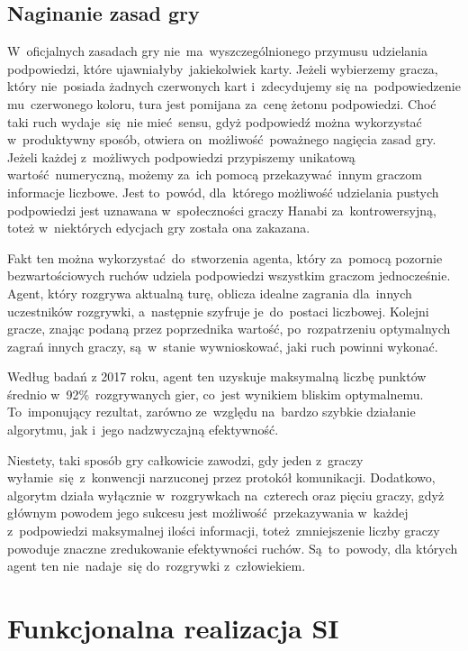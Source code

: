 \documentclass[declaration,shortabstract,inz]{iithesis}
\begin{document}
\section{Naginanie zasad gry}

W~oficjalnych zasadach gry nie~ma~wyszczególnionego przymusu udzielania podpowiedzi, które ujawniałyby jakiekolwiek karty. Jeżeli wybierzemy gracza, który nie~posiada żadnych czerwonych kart i~zdecydujemy się na~podpowiedzenie mu~czerwonego koloru, tura jest pomijana za~cenę żetonu podpowiedzi. Choć taki ruch wydaje~się~nie mieć sensu, gdyż podpowiedź można wykorzystać w~produktywny sposób, otwiera on~możliwość poważnego nagięcia zasad gry. Jeżeli każdej z~możliwych podpowiedzi przypiszemy unikatową wartość numeryczną, możemy za~ich pomocą przekazywać innym graczom informacje liczbowe. Jest to~powód, dla~którego możliwość udzielania pustych podpowiedzi jest uznawana w~społeczności graczy Hanabi za~kontrowersyjną, toteż w~niektórych edycjach gry została ona zakazana.

Fakt ten można wykorzystać do~stworzenia agenta, który za~pomocą pozornie bezwartościowych ruchów udziela podpowiedzi wszystkim graczom jednocześnie. Agent, który rozgrywa aktualną turę, oblicza idealne zagrania dla~innych uczestników rozgrywki, a~następnie szyfruje je~do~postaci liczbowej. Kolejni gracze, znając podaną przez poprzednika wartość, po~rozpatrzeniu optymalnych zagrań innych graczy, są~w~stanie wywnioskować, jaki ruch powinni wykonać.

Według badań z 2017 roku\cite{HatPlayer}, agent ten uzyskuje maksymalną liczbę punktów średnio w~92\%~rozgrywanych gier, co~jest wynikiem bliskim optymalnemu. To~imponujący rezultat, zarówno ze~względu na~bardzo szybkie działanie algorytmu, jak i~jego nadzwyczajną efektywność.

Niestety, taki sposób gry całkowicie zawodzi, gdy jeden z~graczy wyłamie~się z~konwencji narzuconej przez protokół komunikacji. Dodatkowo, algorytm działa wyłącznie w~rozgrywkach na~czterech oraz pięciu graczy, gdyż głównym powodem jego sukcesu jest możliwość przekazywania w~każdej z~podpowiedzi maksymalnej ilości informacji, toteż~zmniejszenie liczby graczy powoduje znaczne zredukowanie efektywności ruchów. Są~to~powody, dla których agent ten nie~nadaje~się do~rozgrywki z~człowiekiem.

\chapter{Funkcjonalna realizacja SI}
\end{document}
